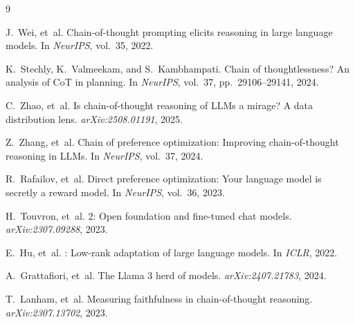 \documentclass{article}
\begin{document}
\small
\begin{thebibliography}{9}

J.~Wei, et~al.
\newblock Chain-of-thought prompting elicits reasoning in large language models.
\newblock In \emph{NeurIPS}, vol.~35, 2022.

K.~Stechly, K.~Valmeekam, and S.~Kambhampati.
\newblock Chain of thoughtlessness? {An} analysis of {CoT} in planning.
\newblock In \emph{NeurIPS}, vol.~37, pp.~29106--29141, 2024.

C.~Zhao, et~al.
\newblock Is chain-of-thought reasoning of {LLMs} a mirage? {A} data distribution lens.
\newblock \emph{arXiv:2508.01191}, 2025.

Z.~Zhang, et~al.
\newblock Chain of preference optimization: Improving chain-of-thought reasoning in {LLMs}.
\newblock In \emph{NeurIPS}, vol.~37, 2024.

R.~Rafailov, et~al.
\newblock Direct preference optimization: Your language model is secretly a reward model.
\newblock In \emph{NeurIPS}, vol.~36, 2023.

H.~Touvron, et~al.
 2: Open foundation and fine-tuned chat models.
\newblock \emph{arXiv:2307.09288}, 2023.

E.~Hu, et~al.
: Low-rank adaptation of large language models.
\newblock In \emph{ICLR}, 2022.

A.~Grattafiori, et~al.
\newblock The {L}lama 3 herd of models.
\newblock \emph{arXiv:2407.21783}, 2024.

T.~Lanham, et~al.
\newblock Measuring faithfulness in chain-of-thought reasoning.
\newblock \emph{arXiv:2307.13702}, 2023.

\end{thebibliography}
\end{document}
